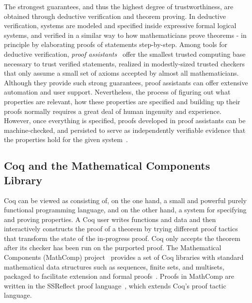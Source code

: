 The strongest guarantees, and thus the highest degree of trustworthiness, are obtained through deductive verification and theorem proving. In deductive verification, systems are modeled and specified inside expressive formal logical systems, and verified in a similar way to how mathematicians prove theorems - in principle by elaborating proofs of statements step-by-step. Among tools for deductive verification, \emph{proof assistants}~\cite{Geuvers2009,Harrison2014} offer the smallest trusted computing base necessary to trust verified statements, realized in modestly-sized trusted checkers that only assume a small set of axioms accepted by almost all mathematicians. Although they provide such strong guarantees, proof assistants can offer extensive automation and user support. Nevertheless, the process of figuring out what properties are relevant, how these properties are specified and building up their proofs normally requires a great deal of human ingenuity and experience. However, once everything is specified, proofs developed in proof assistants can be machine-checked, and persisted to serve as independently verifiable evidence that the properties hold for the given system~\cite{Pollack1998}.

\subsection{Coq and the Mathematical Components Library}

Coq can be viewed as consisting of, on the one hand, a small and powerful purely functional programming language, and on the other hand, a system for specifying and proving properties. A Coq user writes functions and data and then interactively constructs the proof of a theorem by trying different proof tactics that transform the state of the in-progress proof. Coq only accepts the theorem after its checker has been run on the purported proof. The Mathematical Components (MathComp) project~\cite{MathComp} provides a set of Coq libraries with standard mathematical data structures such as sequences, finite sets, and multisets, packaged to facilitate extension and formal proofs~\cite{Garillot2009}. Proofs in MathComp are written in the SSReflect proof language~\cite{Gonthier2010}, which extends Coq's proof tactic language.


